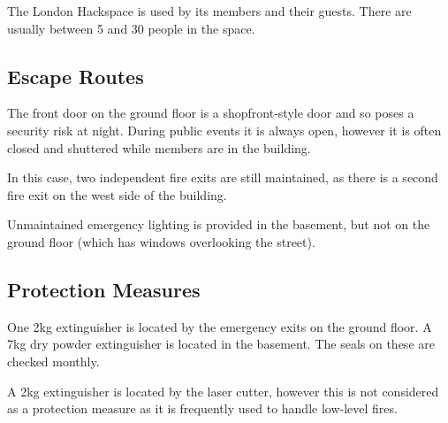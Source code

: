 The London Hackspace is used by its members and their guests. There are
usually between 5 and 30 people in the space.

\subsection{Escape Routes}

The front door on the ground floor is a shopfront-style door and so
poses a security risk at night. During public events it is always open,
however it is often closed and shuttered while members are in the building.

In this case, two independent fire exits are still maintained, as there is
a second fire exit on the west side of the building.

Unmaintained emergency lighting is provided in the basement, but not on
the ground floor (which has windows overlooking the street).

\subsection{Protection Measures}

One 2kg \COtwo extinguisher is located by the emergency exits on the
ground floor. A 7kg dry powder extinguisher is located in the basement.
The seals on these are checked monthly.

A 2kg \COtwo extinguisher is located by the laser cutter, however this is
not considered as a protection measure as it is frequently used to
handle low-level fires.
